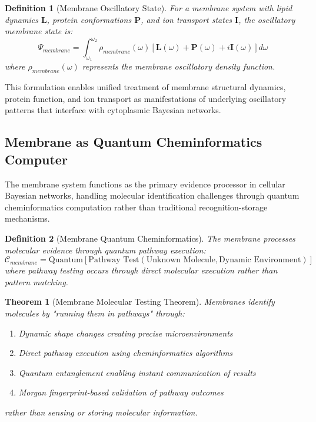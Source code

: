 \documentclass[12pt,a4paper]{article}
\newtheorem{theorem}{Theorem}
\newtheorem{definition}{Definition}
\begin{document}
\begin{definition}[Membrane Oscillatory State]
For a membrane system with lipid dynamics $\mathbf{L}$, protein conformations $\mathbf{P}$, and ion transport states $\mathbf{I}$, the oscillatory membrane state is:
\begin{equation}
\Psi_{membrane} = \int_{\omega_1}^{\omega_2} \rho_{membrane}(\omega) [\mathbf{L}(\omega) + \mathbf{P}(\omega) + i\mathbf{I}(\omega)] d\omega
\end{equation}
where $\rho_{membrane}(\omega)$ represents the membrane oscillatory density function.
\end{definition}

This formulation enables unified treatment of membrane structural dynamics, protein function, and ion transport as manifestations of underlying oscillatory patterns that interface with cytoplasmic Bayesian networks.

\subsection{Membrane as Quantum Cheminformatics Computer}

The membrane system functions as the primary evidence processor in cellular Bayesian networks, handling molecular identification challenges through quantum cheminformatics computation rather than traditional recognition-storage mechanisms.

\begin{definition}[Membrane Quantum Cheminformatics]
The membrane processes molecular evidence through quantum pathway execution:
\begin{equation}
\mathcal{C}_{membrane} = \text{Quantum}\left[\text{Pathway Test}(\text{Unknown Molecule}, \text{Dynamic Environment})\right]
\end{equation}
where pathway testing occurs through direct molecular execution rather than pattern matching.
\end{definition}

\begin{theorem}[Membrane Molecular Testing Theorem]
Membranes identify molecules by "running them in pathways" through:
\begin{enumerate}
\item Dynamic shape changes creating precise microenvironments
\item Direct pathway execution using cheminformatics algorithms
\item Quantum entanglement enabling instant communication of results
\item Morgan fingerprint-based validation of pathway outcomes
\end{enumerate}
rather than sensing or storing molecular information.
\end{theorem}
\end{document}
